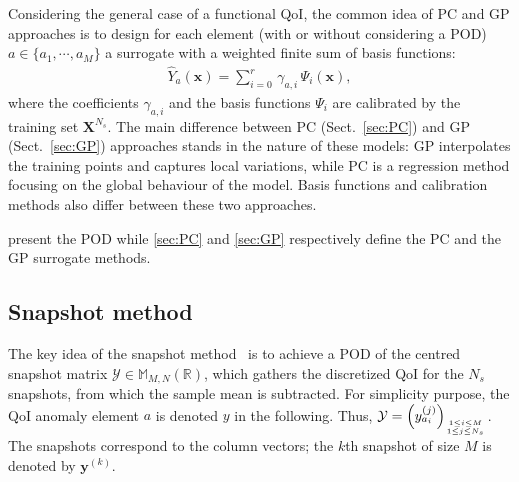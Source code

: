 Considering the general case of a functional QoI, the common idea of PC and GP approaches is to design for each element (with or without considering a POD) $a \in \{a_1, \cdots, a_M\}$ a surrogate with a weighted finite sum of basis functions:
\begin{align}
\widehat{Y}_a\left(\mathbf{x}\right) = \displaystyle\sum_{i = 0}^{r}\,\gamma_{a,i}\,\Psi_{i}\left(\mathbf{x}\right),
\label{eq:SurrogateForm}
\end{align}
where the coefficients $\gamma_{a,i}$ and the basis functions $\Psi_i$ are calibrated by the training set $\mathbf{X}^{N_s}$. The main difference between PC (Sect.~\ref{sec:PC}) and GP (Sect.~\ref{sec:GP}) approaches stands in the nature of these models: GP interpolates the training points and captures local variations, while PC is a regression method focusing on the global behaviour of the model. Basis functions and calibration methods also differ between these two approaches.

 present the POD while \cref{sec:PC} and \cref{sec:GP} respectively define the PC and the GP surrogate methods.


\subsection{Snapshot method}\label{sec:POD}


The key idea of the snapshot method~\citep{sirovich1987} is to achieve a POD of the centred snapshot matrix $\mathcal{Y} \in \mathbb{M}_{M,N}(\mathbb{R})$, which gathers the discretized QoI for the $N_{s}$ snapshots, from which the sample mean is subtracted. For simplicity purpose, the QoI anomaly element $a$ is denoted $y$ in the following. Thus, $\mathcal{Y} = \left(y_{a_i}^{(j)}\right)_{1\leq i \leq M \atop 1\leq j \leq N_{s}}$. The snapshots correspond to the column vectors; the $k$th snapshot of size $M$ is denoted by $\mathbf{y}^{(k)}$.

